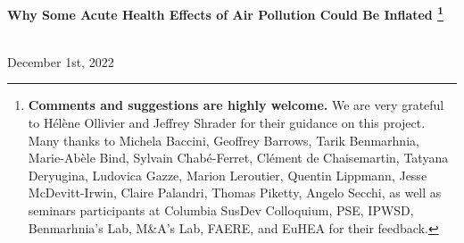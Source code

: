 \documentclass[12pt]{article}
\renewcommand{\thefootnote}{\fnsymbol{footnote}}
\begin{document}



\begin{titlepage}
\vspace*{-2cm}
\begin{flushleft}
\Huge{}\selectfont\textbf{Why Some Acute Health Effects of Air Pollution Could Be Inflated \footnote[2]{\textbf{Comments and suggestions are highly welcome.} We are very grateful to Hélène Ollivier and Jeffrey Shrader for their guidance on this project. Many thanks to Michela Baccini, Geoffrey Barrows, Tarik Benmarhnia, Marie-Abèle Bind, Sylvain Chabé-Ferret, Clément de Chaisemartin, Tatyana Deryugina, Ludovica Gazze, Marion Leroutier, Quentin Lippmann, Jesse McDevitt-Irwin, Claire Palandri, Thomas Piketty, Angelo Secchi, as well as seminars participants at Columbia SusDev Colloquium, PSE, IPWSD, Benmarhnia's Lab,  M\&A's Lab, FAERE, and EuHEA for their feedback.}}
\end{flushleft}
\renewcommand{\thefootnote}{\arabic{footnote}}
\vspace*{0.1cm} 
\begin{flushleft}
\large{}
\\ [0.3cm] 
\normalsize{December 1st, 2022} \\
\end{flushleft}


\begin{abstract}
\small
Hundreds of studies show that air pollution affects health in the immediate short-run, and play a key role in setting air quality standards. Yet, estimated effect sizes sometimes vary widely across studies. Analyzing the results published in epidemiology and economics, we first find that a substantial share of estimates are likely to be inflated due publication bias and a lack of statistical power. Second, we run real data simulations to identify the design parameters causing these issues. We show that this exaggeration may be driven by the small number of exogenous shocks leveraged, by the limited strength of the instruments used or by sparse outcomes. These concerns could extend to studies in other fields relying on comparable research designs. Our paper provides a principled workflow to evaluate and avoid the risk of exaggeration when conducting an observational study.


\end{abstract}
\end{titlepage}
\end{document}
